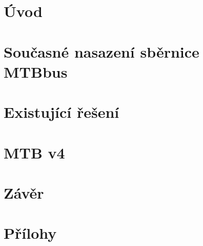 \documentclass[digital, oneside, table, nolot, nolof]{fithesis3}
\begin{document}

\setlength{\parindent}{0cm}
\setlength{\parskip}{3mm plus2pt minus2pt}
\renewenvironment{compactenum}
	{\begin{enumerate}[leftmargin=8mm,itemsep=0pt,parsep=1pt,topsep=1pt,partopsep=1pt]}
	{\end{enumerate}}
\renewenvironment{compactitem}
	{\begin{itemize}[leftmargin=8mm,itemsep=0pt,parsep=0pt,topsep=1pt,partopsep=1pt]}
	{\end{itemize}}



\chapter{Úvod} \label{chap:uvod}


\chapter{Současné nasazení sběrnice MTBbus} \label{chap:nasazeni}


\chapter{Existující řešení} \label{chap:existujici-reseni}


\chapter{MTB v4} \label{chap:mtb-v4}


\chapter{Závěr} \label{chap:zaver}


\printbibliography[heading=bibintoc]

\appendix
\chapter{Přílohy} \label{chap:appendix}

\end{document}
